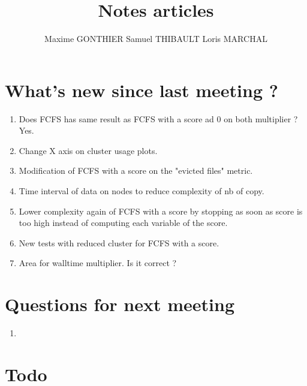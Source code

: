 \documentclass[a4paper]{article}
\title{Notes articles}
\author{Maxime GONTHIER Samuel THIBAULT Loris MARCHAL}
\begin{document}
\newpage

\section{What's new since last meeting ?}

	\begin{enumerate}
		\item Does FCFS has same result as FCFS with a score ad 0 on both multiplier ? Yes.
		\item Change X axis on cluster usage plots.
		\item Modification of FCFS with a score on the "evicted files" metric.
		\item Time interval of data on nodes to reduce complexity of nb of copy.
		\item Lower complexity again of FCFS with a score by stopping as soon as score is too high instead of computing each variable of the score.
		\item New tests with reduced cluster for FCFS with a score.
		\item Area for walltime multiplier. Is it correct ?
	\end{enumerate}
	
\section{Questions for next meeting}

	\begin{enumerate}
		\item
	\end{enumerate}

\section{Todo}
\end{document}
